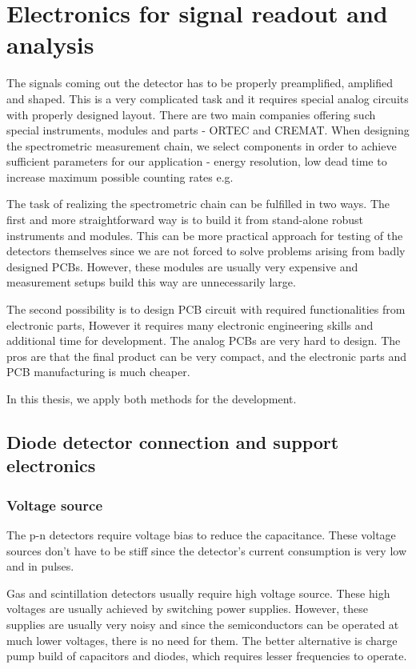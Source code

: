 
\chapter{Electronics for signal readout and analysis}
The signals coming out the detector has to be properly preamplified, amplified and shaped. This is a very complicated task and it requires special analog circuits with properly designed layout. 
There are two main companies offering such special instruments, modules and parts - ORTEC and CREMAT. When designing the spectrometric measurement chain, we select components in order to achieve sufficient parameters for our application - energy resolution, low dead time to increase maximum possible counting rates e.g. 
\par
The task of realizing the spectrometric chain can be fulfilled in two ways. The first and more straightforward way is to build it from stand-alone robust instruments and modules. This can be more practical approach for testing of the detectors themselves since we are not forced to solve problems arising from badly designed PCBs. However, these modules are usually very expensive and measurement setups build this way are unnecessarily large.
\par
The second possibility is to design PCB circuit with required functionalities from electronic parts, However it requires many electronic engineering skills and additional time for development. The analog PCBs are very hard to design. The pros are that the final product can be very compact, and the electronic parts and PCB manufacturing is much cheaper. 
\par
In this thesis, we apply both methods for the development.



\section{Diode detector connection and support electronics}
\subsection{Voltage source}
The p-n detectors require voltage bias to reduce the capacitance.
These voltage sources don't have to be stiff since the detector's current consumption is very low and in pulses.
\par
Gas and scintillation detectors usually require high voltage source. These high voltages are usually achieved by switching power supplies.
However, these supplies are usually very noisy and since the semiconductors can be operated at much lower voltages, there is no need for them. The better alternative is charge pump build of capacitors and diodes, which requires lesser frequencies to operate.
